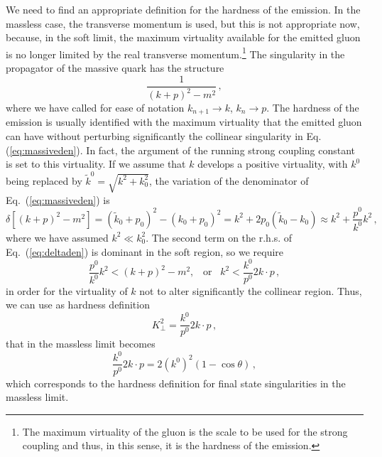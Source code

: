 \documentclass[11pt,a4paper]{article}
\newcommand{\tmop}[1]{\ensuremath{\operatorname{#1}}}
\newcommand{\tmtexttt}[1]{{\ttfamily{#1}}}
\begin{document}
We need to find an appropriate definition for the hardness of the emission. In
the massless case, the transverse momentum is used, but this is not
appropriate now, because, in the soft limit, the maximum virtuality available
for the emitted gluon is no longer limited by the real transverse
momentum.\footnote{The maximum virtuality of the gluon is the scale to be used
for the strong coupling and thus, in this sense, it is the hardness of the
emission.} The singularity in the propagator of the massive quark has the
structure
\begin{equation}
  \frac{1}{(k + p)^2 - m^2} \, , \label{eq:massiveden}
\end{equation}
where we have called for ease of notation $k_{n + 1} \rightarrow k$, $k_n
\rightarrow p$. The hardness of the emission is usually identified with the
maximum virtuality that the emitted gluon can have without perturbing
significantly the collinear singularity in Eq. (\ref{eq:massiveden}). In fact,
the argument of the running strong coupling constant is set to this
virtuality. If we assume that $k$ develops a positive virtuality, with $k^0$
being replaced by $\tilde{k}^0 = \sqrt{k^2 + k_0^2}$, the variation of the
denominator of Eq.~(\ref{eq:massiveden}) is
\begin{equation}
  \delta \left[ (k + p)^2 - m^2 \right] = ( \tilde{k}_0 + p_0)^2 - (k_0 +
  p_0)^2 = k^2 + 2 p_0 ( \tilde{k}_0 - k_0) \approx k^2 + \frac{p^0}{k^0} k^2 \, ,
  \label{eq:deltaden}
\end{equation}
where we have assumed $k^2 \ll k_0^2$. The second term on the r.h.s.
of Eq.~(\ref{eq:deltaden}) is dominant in the soft region, so we require
\begin{equation}
  \frac{p^0}{k^0} k^2 < (k + p)^2 - m^2,\;\; \tmop{or}\;\;
 k^2 < \frac{k^0}{p^0} 2 k 
  \cdot p \, ,
\end{equation}
in order for the virtuality of $k$ not to alter significantly the collinear
region. Thus, we can use as hardness definition
\begin{equation}
  K_{\perp}^2 = \frac{k^0}{p^0} 2 k \cdot p \, ,
\end{equation}
that in the massless limit becomes
\begin{equation}
  \frac{k^0}{p^0} 2 k \cdot p = 2 (k^0)^2 (1 - \cos \theta) \, ,
\end{equation}
which corresponds to the \tmtexttt{POWHEG} \tmtexttt{BOX} hardness definition
for final state singularities in the massless limit.
\end{document}
